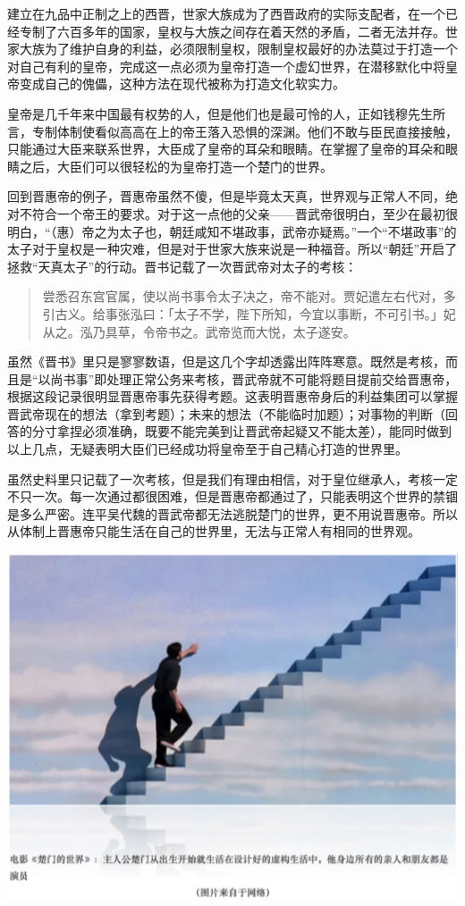 \documentclass[]{book}
\begin{document}
建立在九品中正制之上的西晋，世家大族成为了西晋政府的实际支配者，在一个已经专制了六百多年的国家，皇权与大族之间存在着天然的矛盾，二者无法并存。世家大族为了维护自身的利益，必须限制皇权，限制皇权最好的办法莫过于打造一个对自己有利的皇帝，完成这一点必须为皇帝打造一个虚幻世界，在潜移默化中将皇帝变成自己的傀儡，这种方法在现代被称为打造文化软实力。

皇帝是几千年来中国最有权势的人，但是他们也是最可怜的人，正如钱穆先生所言，专制体制使看似高高在上的帝王落入恐惧的深渊。他们不敢与臣民直接接触，只能通过大臣来联系世界，大臣成了皇帝的耳朵和眼睛。在掌握了皇帝的耳朵和眼睛之后，大臣们可以很轻松的为皇帝打造一个楚门的世界。

回到晋惠帝的例子，晋惠帝虽然不傻，但是毕竟太天真，世界观与正常人不同，绝对不符合一个帝王的要求。对于这一点他的父亲------晋武帝很明白，至少在最初很明白，``（惠）帝之为太子也，朝廷咸知不堪政事，武帝亦疑焉。''一个``不堪政事''的太子对于皇权是一种灾难，但是对于世家大族来说是一种福音。所以``朝廷''开启了拯救``天真太子''的行动。晋书记载了一次晋武帝对太子的考核：

\begin{quote}
尝悉召东宫官属，使以尚书事令太子决之，帝不能对。贾妃遣左右代对，多引古义。给事张泓曰：「太子不学，陛下所知，今宜以事断，不可引书。」妃从之。泓乃具草，令帝书之。武帝览而大悦，太子遂安。
\end{quote}

虽然《晋书》里只是寥寥数语，但是这几个字却透露出阵阵寒意。既然是考核，而且是``以尚书事''即处理正常公务来考核，晋武帝就不可能将题目提前交给晋惠帝，根据这段记录很明显晋惠帝事先获得考题。这表明晋惠帝身后的利益集团可以掌握晋武帝现在的想法（拿到考题）；未来的想法（不能临时加题）；对事物的判断（回答的分寸拿捏必须准确，既要不能完美到让晋武帝起疑又不能太差），能同时做到以上几点，无疑表明大臣们已经成功将皇帝至于自己精心打造的世界里。

虽然史料里只记载了一次考核，但是我们有理由相信，对于皇位继承人，考核一定不只一次。每一次通过都很困难，但是晋惠帝都通过了，只能表明这个世界的禁锢是多么严密。连平吴代魏的晋武帝都无法逃脱楚门的世界，更不用说晋惠帝。所以从体制上晋惠帝只能生活在自己的世界里，无法与正常人有相同的世界观。

\includegraphics[width=6.67in]{images/his6}
\end{document}
